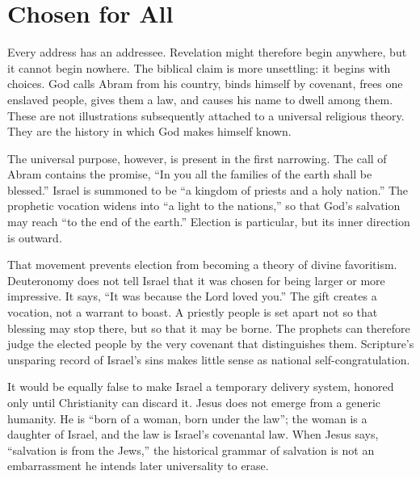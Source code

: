 \section{Chosen for All}

Every address has an addressee. Revelation might therefore begin anywhere, but it cannot begin nowhere. The biblical claim is more unsettling: it begins with choices. God calls Abram from his country, binds himself by covenant, frees one enslaved people, gives them a law, and causes his name to dwell among them. These are not illustrations subsequently attached to a universal religious theory. They are the history in which God makes himself known.

The universal purpose, however, is present in the first narrowing. The call of Abram contains the promise, ``In you all the families of the earth shall be blessed.'' Israel is summoned to be ``a kingdom of priests and a holy nation.'' The prophetic vocation widens into ``a light to the nations,'' so that God's salvation may reach ``to the end of the earth.'' Election is particular, but its inner direction is outward.

That movement prevents election from becoming a theory of divine favoritism. Deuteronomy does not tell Israel that it was chosen for being larger or more impressive. It says, ``It was because the Lord loved you.'' The gift creates a vocation, not a warrant to boast. A priestly people is set apart not so that blessing may stop there, but so that it may be borne. The prophets can therefore judge the elected people by the very covenant that distinguishes them. Scripture's unsparing record of Israel's sins makes little sense as national self-congratulation.

It would be equally false to make Israel a temporary delivery system, honored only until Christianity can discard it. Jesus does not emerge from a generic humanity. He is ``born of a woman, born under the law''; the woman is a daughter of Israel, and the law is Israel's covenantal law. When Jesus says, ``salvation is from the Jews,'' the historical grammar of salvation is not an embarrassment he intends later universality to erase.

